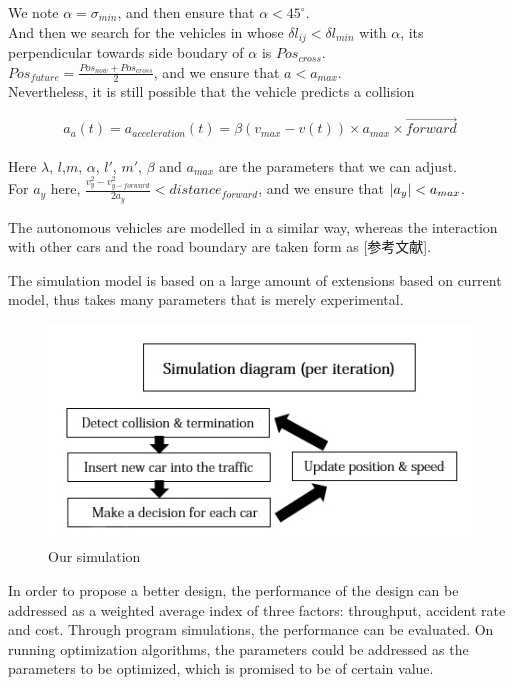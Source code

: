 \documentclass{mcmthesis}
\begin{document}
We note $\alpha=\sigma_{min}$, and then ensure that $\alpha<45^{\circ}$.\\
And then we search for the vehicles in  whose $\delta l_{ij}<\delta l_{min}$ with $\alpha$, its perpendicular towards side boudary of $\alpha$ is $Pos_{cross}$.\\

$Pos_{future}=\frac{Pos_{now}+Pos_{cross}}{2}$, and we ensure that $a<a_{max}$.\\

Nevertheless, it is still possible that the vehicle predicts a collision 

$$a_a(t)=a_{acceleration}(t)=\beta (v_{max}-v(t)) \times a_{max} \times \overrightarrow{forward}$$\\
Here $\lambda$, $l$,$m$, $\alpha$, $l'$, $m'$, $\beta$ and $a_{max}$ are the parameters that we can adjust.\\
For $a_y$ here, $ \frac{v_y^2-v_{y-forward}^2}{2a_{y}}<distance_{forward}$, and we ensure that $\arrowvert a_y \arrowvert<a_{max}$.

The autonomous vehicles are modelled in a similar way, whereas the interaction with other cars and the road boundary are taken form as [参考文献]. 

The simulation model is based on a large amount of extensions based on current model, thus takes many parameters that is merely experimental.

\begin{figure}[htbp]
	\small 
	\centering
	\caption{Our simulation}
	\includegraphics{simulation.jpg}
\end{figure}


In order to propose a better design, the performance of the design can be addressed as a weighted average index of three factors: throughput, accident rate and cost. Through program simulations, the performance can be evaluated. On running optimization algorithms, the parameters could be addressed as the parameters to be optimized, which is promised to be of certain value.
\end{document}
